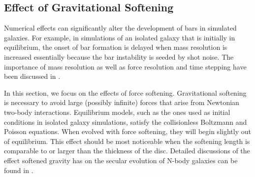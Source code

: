 \subsection{Effect of Gravitational Softening} 

Numerical effects can significantly alter the development of bars in
simulated galaxies. For example, in simulations of an isolated galaxy
that is initially in equilibrium, the onset of bar formation is
delayed when mass resolution is increased \citep{dbs2009}
essentially because the bar instability is seeded by shot noise.  The
importance of mass resolution as well as force resolution and time
stepping have been discussed in \citet{Klypin2009}.

In this section, we focus on the effects of force softening. {Gravitational
softening is necessary to avoid large (possibly infinite) forces that arise
from Newtonian two-body interactions. }
Equilibrium models, such as the ones used as initial conditions in
isolated galaxy simulations, satisfy the collisionless Boltzmann and
Poisson equations.  When evolved with force softening, they will begin
slightly out of equilibrium.  This effect should be most noticeable
when the softening length is comparable to or larger than the
thickness of the disc. {Detailed discussions of the 
effect softened gravity has on the secular evolution of N-body galaxies can be found in
\citet{romeo_1994,AthanassoulaSellwood1986,merritt_1996,weinberg_1996, romeo_1997, romeo_1998}.}

